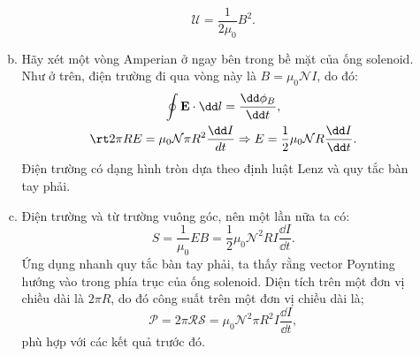 \begin{loigiai}
\begin{enumerate}[1)]
\begin{enumerate}[a)]
$$\mathcal{U}=\dfrac{1}{2\mu_0}B^2.$$
\item Hãy xét một vòng Amperian ở ngay bên trong bề mặt của ống solenoid. Như ở trên, điện trường đi qua vòng này là $B=\mu_0\mathcal{N}I$, do đó:
$$
\begin{gathered}
\oint \mathbf{E} \cdot \dd l =\dfrac{\dd \phi_{B}}{\dd t}, \\
\rt 2 \pi R E=\mu_{0} \mathcal{N} \pi R^{2} \dfrac{\dd I}{d t} \Rightarrow E=\dfrac{1}{2} \mu_{0} \mathcal{N} R \dfrac{\dd I}{\dd t}.
\end{gathered}
$$
Điện trường có dạng hình tròn dựa theo định luật Lenz và quy tắc bàn tay phải.
\item Điện trường và từ trường vuông góc, nên một lần nữa ta có:
$$S=\dfrac{1}{\mu_0}EB=\dfrac{1}{2}\mu_0 \mathcal{N}^2 RI\dfrac{\dd I}{\dd t}.$$
Ứng dụng nhanh quy tắc bàn tay phải, ta thấy rằng vector Poynting hướng vào trong phía trục của ống solenoid. Diện tích trên một đơn vị chiều dài là $2\pi R$, do đó công suất trên một đơn vị chiều dài là;
$$\mathcal{P=2\pi RS}=\mu_0\mathcal{N}^2\pi R^2I\dfrac{\dd I}{\dd t},$$
phù hợp với các kết quả trước đó.
\end{enumerate}
\end{enumerate}
\end{loigiai}
